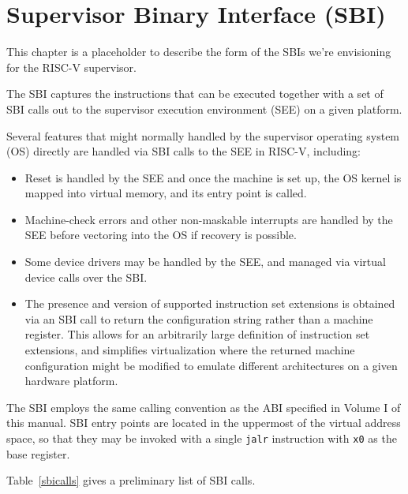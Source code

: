 \chapter{Supervisor Binary Interface (SBI)}

This chapter is a placeholder to describe the form of the SBIs we're
envisioning for the RISC-V supervisor.

The SBI captures the instructions that can be executed together with a
set of SBI calls out to the supervisor execution environment (SEE) on
a given platform.

Several features that might normally handled by the supervisor
operating system (OS) directly are handled via SBI calls to the SEE in
RISC-V, including:

\begin{itemize}

\item Reset is handled by the SEE and once the machine is set up, the
  OS kernel is mapped into virtual memory, and its entry point is called.

\item Machine-check errors and other non-maskable interrupts are
  handled by the SEE before vectoring into the OS if recovery is
  possible.

\item Some device drivers may be handled by the SEE, and managed via
  virtual device calls over the SBI.

\item The presence and version of supported instruction set extensions
  is obtained via an SBI call to return the configuration string
  rather than a machine register.  This allows for an arbitrarily
  large definition of instruction set extensions, and simplifies
  virtualization where the returned machine configuration might be
  modified to emulate different architectures on a given hardware
  platform.

\end{itemize}

The SBI employs the same calling convention as the ABI specified in Volume
I of this manual.  SBI entry points are located in the uppermost
 of the virtual address space, so that they may be invoked with
a single {\tt jalr} instruction with {\tt x0} as the base register.

Table~\ref{sbicalls} gives a preliminary list of SBI calls.


